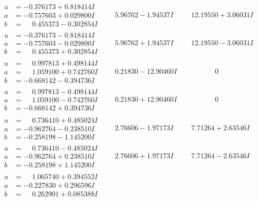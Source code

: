 \documentclass[1p]{elsarticle_modified}
\theoremstyle{definition}
\begin{document}
$$\begin{array}{c|c|c}
\begin{aligned}
u &= -0.376173 + 0.818414 I \\
a &= -0.757603 + 0.029800 I \\
b &= \phantom{-}0.455373 - 0.302854 I\end{aligned}
 & \phantom{-}5.96762 - 1.94537 I & \phantom{-}12.19550 + 3.06031 I \\ \hline\begin{aligned}
u &= -0.376173 - 0.818414 I \\
a &= -0.757603 - 0.029800 I \\
b &= \phantom{-}0.455373 + 0.302854 I\end{aligned}
 & \phantom{-}5.96762 + 1.94537 I & \phantom{-}12.19550 - 3.06031 I \\ \hline\begin{aligned}
u &= \phantom{-}0.997813 + 0.498144 I \\
a &= \phantom{-}1.059100 + 0.742760 I \\
b &= -0.668142 - 0.394736 I\end{aligned}
 & \phantom{-}0.21830 - 12.90460 I & \phantom{-0.000000 } 0 \\ \hline\begin{aligned}
u &= \phantom{-}0.997813 - 0.498144 I \\
a &= \phantom{-}1.059100 - 0.742760 I \\
b &= -0.668142 + 0.394736 I\end{aligned}
 & \phantom{-}0.21830 + 12.90460 I & \phantom{-0.000000 } 0 \\ \hline\begin{aligned}
u &= \phantom{-}0.736410 + 0.485024 I \\
a &= -0.962764 - 0.238510 I \\
b &= -0.258198 - 1.145200 I\end{aligned}
 & \phantom{-}2.76606 - 1.97173 I & \phantom{-}7.71264 + 2.63546 I \\ \hline\begin{aligned}
u &= \phantom{-}0.736410 - 0.485024 I \\
a &= -0.962764 + 0.238510 I \\
b &= -0.258198 + 1.145200 I\end{aligned}
 & \phantom{-}2.76606 + 1.97173 I & \phantom{-}7.71264 - 2.63546 I \\ \hline\begin{aligned}
u &= \phantom{-}1.065740 + 0.394552 I \\
a &= -0.227830 + 0.296596 I \\
b &= \phantom{-}0.262901 + 0.085388 I\end{aligned}

\end{array}$$
\end{document}
